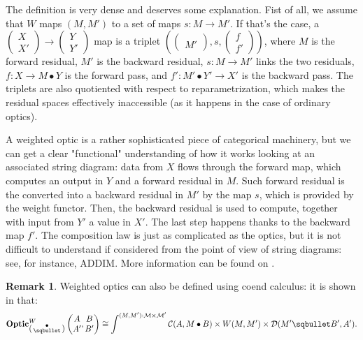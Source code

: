 \documentclass[12pt,a4paper,openright,twoside]{report}
\theoremstyle{plain}
\theoremstyle{definition}
\newtheorem{remark}[proposition]{Remark}
\begin{document}
The definition is very dense and deserves some explanation. Fist of all, we assume that $W$ maps $(M,M')$ to a set of maps $s: M \to M'$. If that's the case, a $\left(\begin{smallmatrix}X\\X'\end{smallmatrix}\right) \to \left(\begin{smallmatrix}Y\\Y'\end{smallmatrix}\right)$ map is a triplet $\left(\left(\begin{smallmatrix}\\M'\end{smallmatrix}\right),s,\left(\begin{smallmatrix}f\\f'\end{smallmatrix}\right)\right)$, where $M$ is the forward residual, $M'$ is the backward residual, $s: M \to M'$ links the two residuals, $f: X \to M \bullet Y$ is the forward pass, and $f': M' \bullet Y' \to X'$ is the backward pass.
The triplets are also quotiented with respect to reparametrization, which makes the residual spaces effectively inaccessible (as it happens in the case of ordinary optics).


A weighted optic is a rather sophisticated piece of categorical machinery, but we can get a clear "functional" understanding of how it works looking at an associated string diagram: data from $X$ flows through the forward map, which computes an output in $Y$ and a forward residual in $M$. Such forward residual is the converted into a backward residual in $M'$ by the map $s$, which is provided by the weight functor. Then, the backward residual is used to compute, together with input from $Y'$ a value in $X'$. The last step happens thanks to the backward map $f'$. The composition law is just as complicated as the optics, but it is not difficult to understand if considered from the point of view of string diagrams: see, for instance, ADDIM. More information can be found on \cite{gavranovic2024fundamental}.


\begin{remark}
  Weighted optics can also be defined using coend calculus: it is shown in \cite{gavranovic2024fundamental} that:
  \[\mathbf{Optic}^W_{\left(\begin{smallmatrix}\bullet\\\sqbullet\end{smallmatrix}\right)}\left(\begin{matrix} A \\ A'\end{matrix},\begin{matrix} B \\ B'\end{matrix}\right) \cong \int^{(M,M') : \mathcal{M} \times \mathcal{M}'}\mathcal{C}(A, M \bullet B) \times W(M,M') \times \mathcal{D}(M' \sqbullet B', A').\]
\end{remark}
\end{document}
